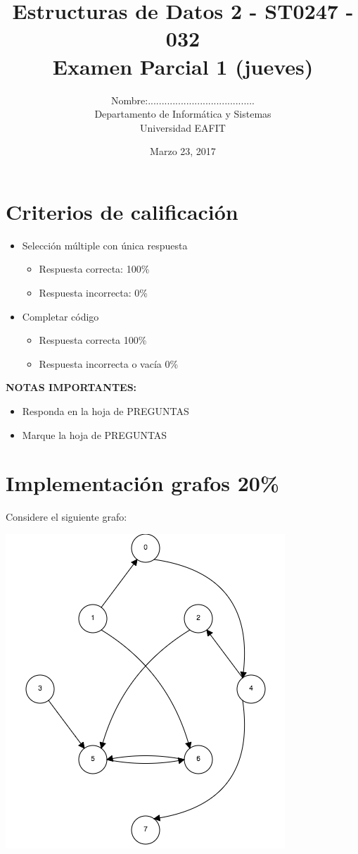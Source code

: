 \documentclass[twocolumn]{article}
\author{
Nombre:....................................... \\
    Departamento de Informática y Sistemas \\
    Universidad EAFIT \\
}
\title{
    Estructuras de Datos 2 - ST0247 - 032 \\
    Examen Parcial 1 (jueves)
}
\date{
    Marzo 23, 2017
}
\begin{document}
\vspace{-5cm}
\maketitle


\section*{Criterios de calificación}

\begin{itemize}
\item Selección múltiple con única respuesta
\begin{itemize}
\item Respuesta correcta: 100\%
\item Respuesta incorrecta: 0\%
\end{itemize}

\item Completar código
\begin{itemize}
\item Respuesta correcta 100\%
\item Respuesta incorrecta o vacía 0\%
\end{itemize}
\end{itemize}

\vspace{1cm}

\textbf{NOTAS IMPORTANTES:}
\begin{itemize}
	\item Responda en la hoja de PREGUNTAS
	\item Marque la hoja de PREGUNTAS
\end{itemize}


\section{Implementación grafos 20\%}
Considere el siguiente grafo:

\begin{center}
\includegraphics[scale=0.5]{grafin2.png}
\end{center}
\end{document}
